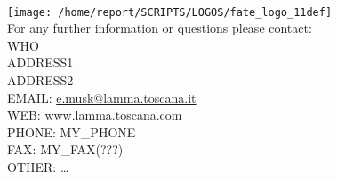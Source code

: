 
\clearpage

\vspace{1.5cm}
\begin{flushleft}
\HRule \\[0.4cm]
{\texttt{[image: /home/report/SCRIPTS/LOGOS/fate\_logo\_11def]}}
\\
\Large{For any further information or questions please contact:
\\ WHO
\\ ADDRESS1
\\ ADDRESS2
\\ EMAIL: \href{mailto:e.musk@lamma.toscana.it}{e.musk@lamma.toscana.it}
\\ WEB: \href{www.lamma.toscana.com}{www.lamma.toscana.com}
\\ PHONE: MY\_PHONE
\\ FAX: MY\_FAX(???)
\\ OTHER: \dots}
\HRule \\[0.4cm]
\end{flushleft}




